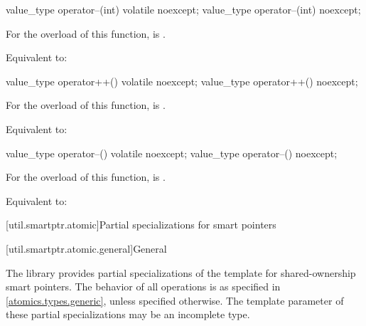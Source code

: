 %
%
\begin{itemdecl}
value_type operator--(int) volatile noexcept;
value_type operator--(int) noexcept;
\end{itemdecl}

\begin{itemdescr}
\pnum
\constraints
For the  overload of this function,
 is .

\pnum
\effects
Equivalent to: 
\end{itemdescr}

%
%
\begin{itemdecl}
value_type operator++() volatile noexcept;
value_type operator++() noexcept;
\end{itemdecl}

\begin{itemdescr}
\pnum
\constraints
For the  overload of this function,
 is .

\pnum
\effects
Equivalent to: 
\end{itemdescr}

%
%
\begin{itemdecl}
value_type operator--() volatile noexcept;
value_type operator--() noexcept;
\end{itemdecl}

\begin{itemdescr}
\pnum
\constraints
For the  overload of this function,
 is .

\pnum
\effects
Equivalent to: 
\end{itemdescr}

[util.smartptr.atomic]{Partial specializations for smart pointers}%
%

[util.smartptr.atomic.general]{General}

\pnum
The library provides partial specializations of the  template
for shared-ownership smart pointers.
The behavior of all operations is as specified in \ref{atomics.types.generic},
unless specified otherwise.
The template parameter  of these partial specializations
may be an incomplete type.

